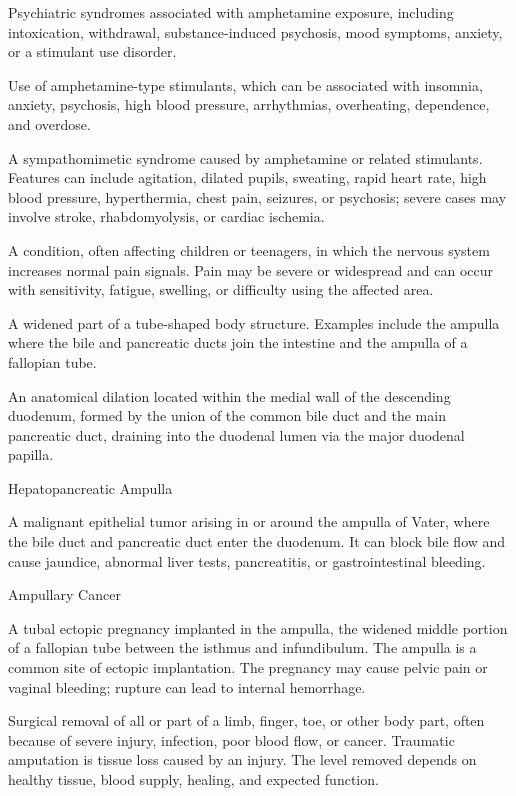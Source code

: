  Psychiatric syndromes associated with amphetamine exposure, including intoxication, withdrawal, substance-induced psychosis, mood symptoms, anxiety, or a stimulant use disorder.

 Use of amphetamine-type stimulants, which can be associated with insomnia, anxiety, psychosis, high blood pressure, arrhythmias, overheating, dependence, and overdose.

 A sympathomimetic syndrome caused by amphetamine
or related stimulants. Features can include agitation, dilated pupils, sweating,
rapid heart rate, high blood pressure, hyperthermia, chest pain, seizures, or
psychosis; severe cases may involve stroke, rhabdomyolysis, or cardiac ischemia.

 A condition, often affecting children or teenagers, in which the nervous system increases normal pain signals. Pain may be severe or widespread and can occur with sensitivity, fatigue, swelling, or difficulty using the affected area.

 A widened part of a tube-shaped body structure. Examples include the ampulla where the bile and pancreatic ducts join the intestine and the ampulla of a fallopian tube.

 An anatomical dilation located within the medial wall of the descending duodenum, formed by the union of the common bile duct and the main pancreatic duct, draining into the duodenal lumen via the major duodenal papilla.

\synonyms
Hepatopancreatic Ampulla

 A malignant epithelial tumor arising in or around the ampulla of Vater, where the bile duct and pancreatic duct enter the duodenum.
It can block bile flow and cause jaundice, abnormal liver tests, pancreatitis, or gastrointestinal bleeding.

\synonyms
Ampullary Cancer

 A tubal ectopic pregnancy implanted in the ampulla, the widened middle portion of a fallopian tube between the isthmus and infundibulum. The ampulla is a common site of ectopic implantation. The pregnancy may cause pelvic pain or vaginal bleeding; rupture can lead to internal hemorrhage.

 Surgical removal of all or part of a limb, finger, toe, or other body part, often because of severe injury, infection, poor blood flow, or cancer. Traumatic amputation is tissue loss caused by an injury. The level removed depends on healthy tissue, blood supply, healing, and expected function.

